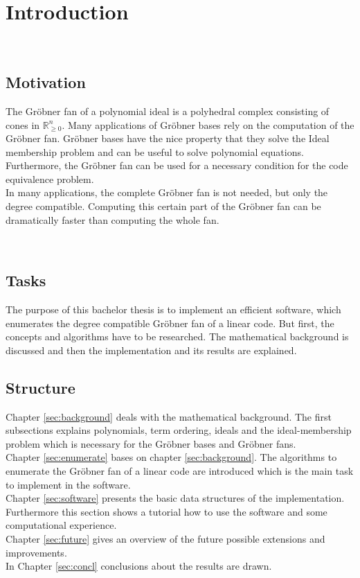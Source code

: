 \section{Introduction}

~\\
\subsection{Motivation}
The Gröbner fan of a polynomial ideal is a polyhedral complex consisting of cones in $\mathbb{R}_{\geq 0}^{n}$.
Many applications of Gröbner bases rely on the computation of the Gröbner fan.
Gröbner bases have the nice property that they solve the Ideal membership problem and can be useful to solve polynomial equations.
Furthermore, the Gröbner fan can be used for a necessary condition for the code equivalence problem. \\
In many applications, the complete Gröbner fan is not needed, but only the degree compatible. 
Computing this certain part of the Gröbner fan can be dramatically faster than computing the whole fan.

~\\

\subsection{Tasks}
The purpose of this bachelor thesis is to implement an efficient software, which enumerates the degree compatible Gröbner fan of a linear code. But first, the concepts and algorithms have to be researched. The mathematical background is discussed and then the implementation and its results are explained. 

\newpage

\subsection{Structure}
Chapter \ref{sec:background} deals with the mathematical background. The first subsections explains polynomials, term ordering, ideals and the ideal-membership problem which is necessary for the Gröbner bases and Gröbner fans. \\
Chapter \ref{sec:enumerate} bases on chapter \ref{sec:background}. The algorithms to enumerate the Gröbner fan of a linear code are introduced which is the main task to implement in the software.\\
Chapter \ref{sec:software} presents the basic data structures of the implementation. Furthermore this section shows a tutorial how to use the software and some computational experience.\\
Chapter \ref{sec:future} gives an overview of the future possible extensions and improvements.\\
In Chapter \ref{sec:concl} conclusions about the results are drawn.
\newpage